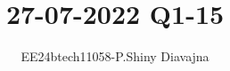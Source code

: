 \documentclass[journal]{IEEEtran}
\begin{document}

\vspace{3cm}

\title{27-07-2022 Q1-15}
\author{EE24btech11058-P.Shiny Diavajna}
{\let\newpage\relax\maketitle}

\renewcommand{\thefigure}{\theenumi}
\renewcommand{\thetable}{\theenumi}
\setlength{\intextsep}{10pt} %


\renewcommand{\thetable}{\theenumi}
\end{document}
